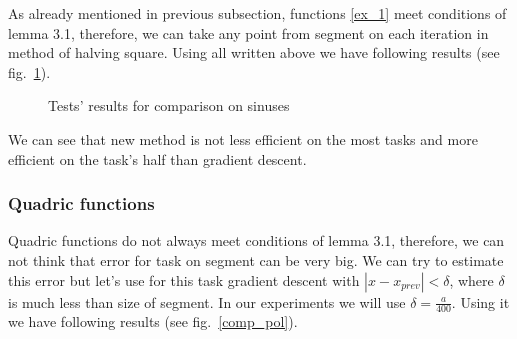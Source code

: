 \documentclass[12pt]{article}
\begin{document}
As already mentioned in previous subsection, functions \eqref{ex_1} meet conditions of lemma 3.1, therefore, we can take any point from segment on each iteration in method of halving square. Using all written above we have following results (see fig.~\ref{comp_sinuses}).

\begin{figure}[h!]
\caption{Tests' results for comparison on sinuses}
\label{comp_sinuses}
\end{figure}

We can see that new method is not less efficient on the most tasks and more efficient on the task's half than gradient descent.

\subsubsection{Quadric functions}

Quadric functions do not always meet conditions of lemma 3.1, therefore, we can not think that error for task on segment can be very big. We can try to estimate this error but let's use for this task gradient descent with $|x-x_{prev}|<\delta$, where $\delta$ is much less than size of segment. In our experiments we will use $\delta = \frac{a}{400}$. Using it we have following results (see fig.~\ref{comp_pol}).
\end{document}
